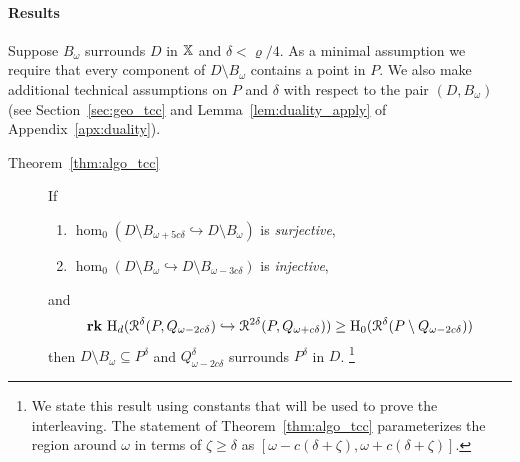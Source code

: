 
\paragraph{Results}

Suppose $B_\omega$ surrounds $D$ in $\mathbb{X}$ and $\delta < \varrho / 4$.
As a minimal assumption we require that every component of $D\setminus B_\omega$ contains a point in $P$.
We also make additional technical assumptions on $P$ and $\delta$ with respect to the pair $(D, B_\omega)$ (see Section~\ref{sec:geo_tcc} and Lemma~\ref{lem:duality_apply} of Appendix~\ref{apx:duality}).

\begin{description}
  \item[Theorem~\ref{thm:algo_tcc}] If
    \begin{enumerate}[label=\Roman*.]
      \item $\hom_0(D\setminus B_{\omega+5c\delta}\hookrightarrow D\setminus B_\omega)$ is \emph{surjective},
      \item $\hom_0(D\setminus B_\omega\hookrightarrow D\setminus B_{\omega-3c\delta})$ is \emph{injective},
    \end{enumerate}
    and
    \[ \mathbf{rk}~\mathrm{H}_d(\mathcal{R}^\delta(P, Q_{\omega - 2c\delta})\hookrightarrow \mathcal{R}^{2\delta}(P, Q_{\omega+c\delta}))\geq \mathrm{H}_0(\mathcal{R}^\delta(P\setminus Q_{\omega-2c\delta})) \]
    then $D\setminus B_\omega\subseteq P^\delta$ and $Q_{\omega-2c\delta}^\delta$ surrounds $P^\delta$ in $D$.
    \footnote{We state this result using constants that will be used to prove the interleaving.
      The statement of Theorem~\ref{thm:algo_tcc} parameterizes the region around $\omega$ in terms of $\zeta\geq\delta$ as $[\omega-c(\delta+\zeta),\omega+c(\delta+\zeta)]$.}
\end{description}

